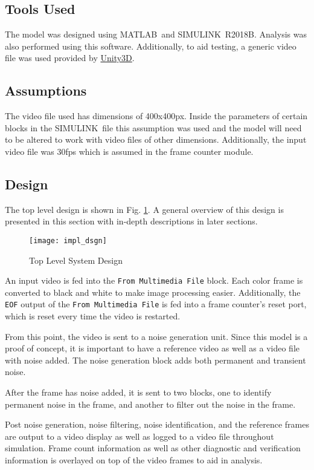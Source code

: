 \subsection{Tools Used}
The model was designed using MATLAB\textregisteredmark\ and SIMULINK\textregisteredmark\ R2018B. Analysis was also performed using this software. Additionally, to aid testing, a generic video file was used provided by \hyperlink{https://blogs.unity3d.com/2016/11/28/free-vfx-image-sequences-flipbooks/}{Unity3D}.
\subsection{Assumptions}
The video file used has dimensions of 400x400px. Inside the parameters of certain blocks in the SIMULINK\textregisteredmark\ file this assumption was used and the model will need to be altered to work with video files of other dimensions. Additionally, the input video file was 30fps which is assumed in the frame counter module.
\subsection{Design}
The top level design is shown in Fig. \ref{fig:sysSpecs}. A general overview of this design is presented in this section with in-depth descriptions in later sections.
\begin{figure}[H]
    \texttt{[image: impl\_dsgn]}
    \caption{Top Level System Design}
    \label{fig:sysSpecs}
\end{figure}
\par An input video is fed into the \verb!From Multimedia File! block. Each color frame is converted to black and white to make image processing easier. Additionally, the \verb!EOF! output of the \verb!From Multimedia File! is fed into a frame counter's reset port, which is reset every time the video is restarted.
\par From this point, the video is sent to a noise generation unit. Since this model is a proof of concept, it is important to have a reference video as well as a video file with noise added. The noise generation block adds both permanent and transient noise.
\par After the frame has noise added, it is sent to two blocks, one to identify permanent noise in the frame, and another to filter out the noise in the frame.
\par Post noise generation, noise filtering, noise identification, and the reference frames are output to a video display as well as logged to a video file throughout simulation. Frame count information as well as other diagnostic and verification information is overlayed on top of the video frames to aid in analysis.
